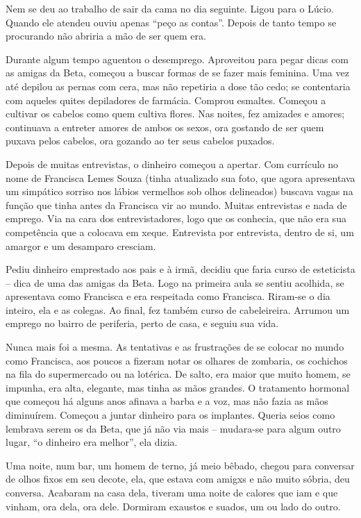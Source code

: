\documentclass[11pt,a4paper,twoside,openany]{book}
\begin{document}
Nem se deu ao trabalho de sair da cama no dia seguinte. Ligou para o Lúcio. Quando ele atendeu ouviu apenas “peço as contas”. Depois de tanto tempo se procurando não abriria a mão de ser quem era.

Durante algum tempo aguentou o desemprego. Aproveitou para pegar dicas com as amigas da Beta, começou a buscar formas de se fazer mais feminina. Uma vez até depilou as pernas com cera, mas não repetiria a dose tão cedo; se contentaria com aqueles quites depiladores de farmácia. Comprou esmaltes. Começou a cultivar os cabelos como quem cultiva flores. Nas noites, fez amizades e amores; continuava a entreter amores de ambos os sexos, ora gostando de ser quem puxava pelos cabelos, ora gozando ao ter seus cabelos puxados.

Depois de muitas entrevistas, o dinheiro começou a apertar. Com currículo no nome de Francisca Lemes Souza (tinha atualizado sua foto, que agora apresentava um simpático sorriso nos lábios vermelhos sob olhos delineados) buscava vagas na função que tinha antes da Francisca vir ao mundo. Muitas entrevistas e nada de emprego. Via na cara dos entrevistadores, logo que os conhecia, que não era sua competência que a colocava em xeque. Entrevista por entrevista, dentro de si, um amargor e um desamparo cresciam.

Pediu dinheiro emprestado aos pais e à irmã, decidiu que faria curso de esteticista – dica de uma das amigas da Beta. Logo na primeira aula se sentiu acolhida, se apresentava como Francisca e era respeitada como Francisca. Riram-se o dia inteiro, ela e as colegas. Ao final, fez também curso de cabeleireira. Arrumou um emprego no bairro de periferia, perto de casa, e seguiu sua vida.

Nunca mais foi a mesma. As tentativas e as frustrações de se colocar no mundo como Francisca, aos poucos a fizeram notar os olhares de zombaria, os cochichos na fila do supermercado ou na lotérica. De salto, era maior que muito homem, se impunha, era alta, elegante, mas tinha as mãos grandes. O tratamento hormonal que começou há alguns anos afinava a barba e a voz, mas não fazia as mãos diminuírem. Começou a juntar dinheiro para os implantes. Queria seios como lembrava serem os da Beta, que já não via mais – mudara-se para algum outro lugar, “o dinheiro era melhor”, ela dizia.

Uma noite, num bar, um homem de terno, já meio bêbado, chegou para conversar de olhos fixos em seu decote, ela, que estava com amigxs e não muito sóbria, deu conversa. Acabaram na casa dela, tiveram uma noite de calores que iam e que vinham, ora dela, ora dele. Dormiram exaustos e suados, um ou lado do outro. 
\end{document}
